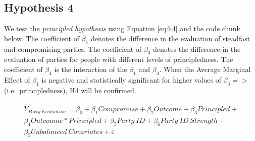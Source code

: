 \documentclass[]{article}
\begin{document}
\hypertarget{hypothesis-4}{%
\subsection{Hypothesis 4}\label{hypothesis-4}}

We test the \emph{principled hypothesis} using Equation \ref{eq:h4} and
the code chunk below. The coefficient of \(\beta_{1}\) denotes the
difference in the evaluation of steadfast and compromising parties. The
coefficient of \(\beta_{3}\) denotes the difference in the evaluation of
parties for people with different levels of principledness. The
coefficient of \(\beta_{4}\) is the interaction of the \(\beta_{1}\) and
\(\beta_{3}\). When the Average Marginal Effect of \(\beta_{1}\) is
negative and statistically significant for higher values of
\(\beta_{3} = >\) (i.e.~principledness), H4 will be confirmed.

\begin{equation}\label{eq:h4}
  \begin{aligned}
      \hat{Y}_{Party \ Evaluation} = \beta_{0} + \beta_{1}Compromise  +
      \beta_{2}Outcome + \beta_{3}Principled  +\nonumber \\
      \beta_{4}Outcoume * Principled + 
      \beta_{5}Party\ ID + \beta_{6}Party \ ID \ Strength +\nonumber \\
      \beta_{5}Unbalanced \ Covariates + \varepsilon
    \end{aligned}
\end{equation}
\end{document}
